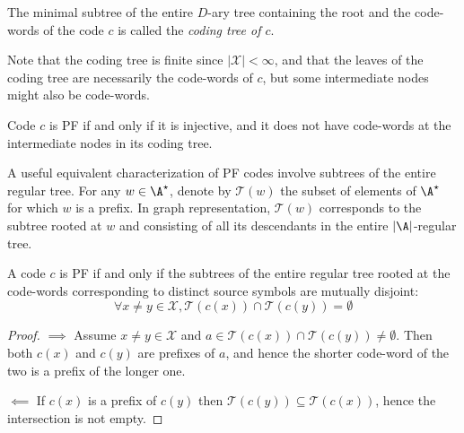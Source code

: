 \documentclass{../cs-classes/cs-classes}
\newcommand*{\X}{\mathcal{X}}
\begin{document}
\begin{definition}
    The minimal subtree of the entire $D$-ary tree containing the root and the code-words of the code $c$ is called the \emph{coding tree of $c$}.

    Note that the coding tree is finite since $|\X|<\infty$, and that the leaves of the coding tree are necessarily the code-words of $c$, but some intermediate nodes might also be code-words.
\end{definition}

\begin{lemma}
    Code $c$ is PF if and only if it is injective, and it does not have code-words at the intermediate nodes in its coding tree.
\end{lemma}


A useful equivalent characterization of PF codes involve subtrees of the entire regular tree. For any $w\in\A^\star$, denote by $\mathcal{T}(w)$ the subset of elements of $\A^\star$ for which $w$ is a prefix. In graph representation, $\mathcal{T}(w)$ corresponds to the subtree rooted at $w$ and consisting of all its descendants in the entire $|\A|$-regular tree.

\begin{lemma}
    A code $c$ is PF if and only if the subtrees of the entire regular tree rooted at the code-words corresponding to distinct source symbols are mutually disjoint:
    \begin{equation*}
        \forall x\neq y\in \X, \mathcal{T}(c(x))\cap\mathcal{T}(c(y))=\emptyset
    \end{equation*}
\end{lemma}

\begin{proof}
    $\implies$
    Assume $x\neq y\in\X$ and $a\in \mathcal{T}(c(x))\cap\mathcal{T}(c(y))\neq\emptyset$. Then both $c(x)$ and $c(y)$ are prefixes of $a$, and hence the shorter code-word of the two is a prefix of the longer one.

    $\impliedby$ If $c(x)$ is a prefix of $c(y)$ then $\mathcal{T}(c(y))\subseteq \mathcal{T}(c(x))$, hence the intersection is not empty.    
\end{proof}
\end{document}
